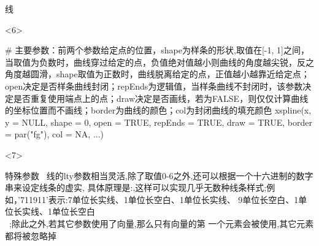 \documentclass{beamerthemeMono}
\begin{document}
\begin{frame}[t,fragile]{\subsecname}{线}
\begin{onlyenv}<6>
\begin{rcode}
# 主要参数：前两个参数给定点的位置，shape为样条的形状,取值在[-1, 1]之间，当取值为负数时，曲线穿过给定的点，负值绝对值越小则曲线的角度越尖锐，反之角度越圆滑，shape取值为正数时，曲线脱离给定的点，正值越小越靠近给定点；open决定是否样条曲线封闭；repEnds为逻辑值，当样条曲线不封闭时，该参数决定是否重复使用端点上的点；draw决定是否画线，若为FALSE，则仅仅计算曲线的坐标位置而不画线；border为曲线的颜色；col为封闭曲线的填充颜色
xspline(x, y = NULL, shape = 0, open = TRUE, repEnds = TRUE, draw = TRUE, border = par("fg"), col = NA, ...)
\end{rcode}
\end{onlyenv} 

\begin{onlyenv}<7>
\begin{block}{\small 特殊参数}\footnotesize 
\HandPencilLeft~线的lty参数相当灵活,除了取值0-6之外,还可以根据一个十六进制的数字串来设定线条的虚实,
具体原理是:,这样可以实现几乎无数种线条样式;例如，’711911’表示:7单位长实线、1单位长空白、1单位长实线、
9单位长空白、1单位长实线、1单位长空白\\
\HandPencilLeft~;除此之外,若其它参数使用了向量,那么只有向量的第
一个元素会被使用,其它元素都将被忽略掉
\end{block}
\end{onlyenv}  
\end{frame}
\end{document}
